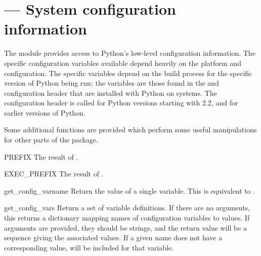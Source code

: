 \section{ ---
         System configuration information}



The  module provides access to Python's
low-level configuration information.  The specific configuration
variables available depend heavily on the platform and configuration.
The specific variables depend on the build process for the specific
version of Python being run; the variables are those found in the
 and configuration header that are installed with
Python on \UNIX{} systems.  The configuration header is called
 for Python versions starting with 2.2, and
 for earlier versions of Python.

Some additional functions are provided which perform some useful
manipulations for other parts of the  package.


\begin{datadesc}{PREFIX}
  The result of .
\end{datadesc}

\begin{datadesc}{EXEC_PREFIX}
  The result of .
\end{datadesc}

\begin{funcdesc}{get_config_var}{name}
  Return the value of a single variable.  This is equivalent to
  .
\end{funcdesc}

\begin{funcdesc}{get_config_vars}{\moreargs}
  Return a set of variable definitions.  If there are no arguments,
  this returns a dictionary mapping names of configuration variables
  to values.  If arguments are provided, they should be strings, and
  the return value will be a sequence giving the associated values.
  If a given name does not have a corresponding value, 
  will be included for that variable.
\end{funcdesc}

